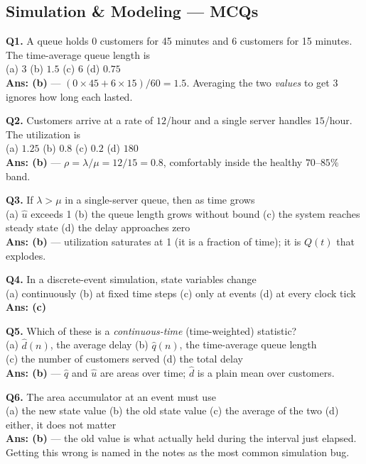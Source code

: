 \subsection{Simulation \& Modeling --- MCQs}

\begin{mcqbox}
\textbf{Q1.} A queue holds 0 customers for 45 minutes and 6 customers for 15 minutes. The time-average queue length is\\
(a) $3$ \quad (b) $1.5$ \quad (c) $6$ \quad (d) $0.75$\\
\textbf{Ans: (b)} --- $(0\times45 + 6\times15)/60 = 1.5$. Averaging the two \emph{values} to get 3 ignores how long each lasted.

\textbf{Q2.} Customers arrive at a rate of $12$/hour and a single server handles $15$/hour. The utilization is\\
(a) $1.25$ \quad (b) $0.8$ \quad (c) $0.2$ \quad (d) $180$\\
\textbf{Ans: (b)} --- $\rho = \lambda/\mu = 12/15 = 0.8$, comfortably inside the healthy $70$--$85\%$ band.

\textbf{Q3.} If $\lambda > \mu$ in a single-server queue, then as time grows\\
(a) $\hat u$ exceeds 1 \quad (b) the queue length grows without bound \quad (c) the system reaches steady state \quad (d) the delay approaches zero\\
\textbf{Ans: (b)} --- utilization saturates at 1 (it is a fraction of time); it is $Q(t)$ that explodes.

\textbf{Q4.} In a discrete-event simulation, state variables change\\
(a) continuously \quad (b) at fixed time steps \quad (c) only at events \quad (d) at every clock tick\\
\textbf{Ans: (c)}

\textbf{Q5.} Which of these is a \emph{continuous-time} (time-weighted) statistic?\\
(a) $\hat d(n)$, the average delay \quad (b) $\hat q(n)$, the time-average queue length\\
(c) the number of customers served \quad (d) the total delay\\
\textbf{Ans: (b)} --- $\hat q$ and $\hat u$ are areas over time; $\hat d$ is a plain mean over customers.

\textbf{Q6.} The area accumulator at an event must use\\
(a) the new state value \quad (b) the old state value \quad (c) the average of the two \quad (d) either, it does not matter\\
\textbf{Ans: (b)} --- the old value is what actually held during the interval just elapsed. Getting this wrong is named in the notes as the most common simulation bug.


\end{mcqbox}
